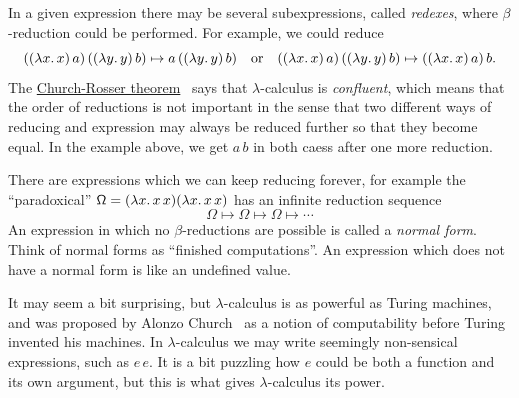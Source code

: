 In a given expression there may be several subexpressions, called
\emph{redexes}, where $\beta$-reduction could be performed. For
example, we could reduce
%
\begin{equation*}
  ((\lambda x .\,x)\, a)\,((\lambda y .\,y)\,b) \mapsto
  a\, ((\lambda y .\,y)\,b)
  \quad\text{or}\quad
  ((\lambda x .\,x)\, a)\,((\lambda y .\,y)\,b) \mapsto
  ((\lambda x .\,x)\, a)\, b.
\end{equation*}
%
The \href{http://en.wikipedia.org/wiki/Church%E2%80%93Rosser_theorem}{Church-Rosser theorem}~\cite{church36:_some_proper_of_conver} says that
$\lambda$-calculus is \emph{confluent}, which means that the order of
reductions is not important in the sense that two different ways of
reducing and expression may always be reduced further so that they
become equal. In the example above, we get $a\,b$ in both caess after
one more reduction.

There are expressions which we can keep reducing forever, for example
the ``paradoxical'' $\mathsf{\Omega} =
(\lambda x .\,x\,x)(\lambda x .\,x\,x)$ has an infinite reduction sequence
%
\begin{equation*}
  \Omega \mapsto \Omega \mapsto \Omega \mapsto \cdots
\end{equation*}
%
An expression in which no $\beta$-reductions are possible is called a
\emph{normal form}. Think of normal forms as ``finished
computations''. An expression which does not have a normal form is
like an undefined value.

It may seem a bit surprising, but $\lambda$-calculus is as powerful as
Turing machines, and was proposed by Alonzo Church~\cite{church} as a
notion of computability before Turing invented his machines. In
$\lambda$-calculus we may write seemingly non-sensical expressions,
such as $e\, e$. It is a bit puzzling how $e$ could be both a function
and its own argument, but this is what gives $\lambda$-calculus its
power.

